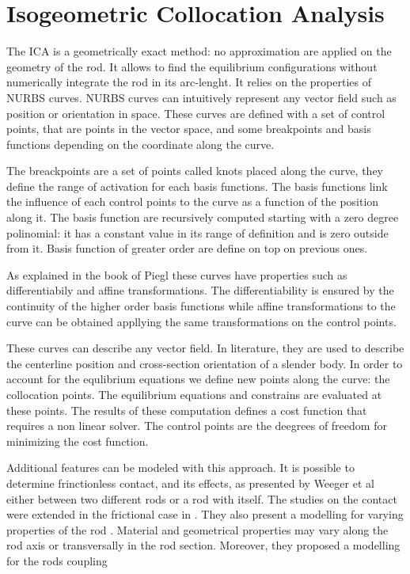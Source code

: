 \documentclass{thesisreport}
\begin{document}
 
 \section{Isogeometric Collocation Analysis}
 The ICA is a geometrically exact method: no approximation are applied on the geometry of the rod. It allows to find the equilibrium configurations without numerically integrate the rod in its arc-lenght. 
 It relies on the properties of NURBS curves\cite{piegl_nurbs_1997}. NURBS curves can intuitively represent any vector field such as position or orientation in space. These curves are defined with a set of control points, that are points in the vector space, and some breakpoints and basis functions depending on the coordinate along the curve.
 
  The breackpoints are a set of points called knots placed along the curve, they define the range of activation for each basis functions. The basis functions link the influence of each control points to the curve as a function of the position along it. The basis function are recursively computed starting with a zero degree polinomial: it has a constant value in its range of definition and is zero outside from it. Basis function of greater order are define on top on previous ones. 
  
 As explained in the book of Piegl \cite{piegl_nurbs_1997} these curves have properties such as differentiabily and affine transformations. The differentiability is ensured by the continuity of the higher order basis functions while affine transformations to the curve can be obtained appllying the same transformations on the control points.
 
 These curves can describe any vector field. In literature\cite{weeger_isogeometric_2017-1}, they are used to describe the centerline position and cross-section orientation of a slender body. In order to account for the equlibrium equations we define new points along the curve: the collocation points. The equilibrium equations and constrains are evaluated at these points. The results of these computation defines a cost function that requires a non linear solver. The control points are the deegrees of freedom for minimizing the cost function.
 
 Additional features can be modeled with this approach. It is possible to determine frinctionless contact, and its effects, as presented by Weeger et al\cite{weeger_isogeometric_2017} either between two different rods or a rod with itself. The studies on the contact were extended in the frictional case in \cite{weeger_isogeometric_2018}. They also present a modelling for varying properties of the rod \cite{weeger_fully_2018}. Material and geometrical properties may vary along the rod axis or transversally in the rod section. Moreover, they proposed a modelling for the rods coupling \cite{weeger_isogeometric_2017-1}
 
\end{document}
